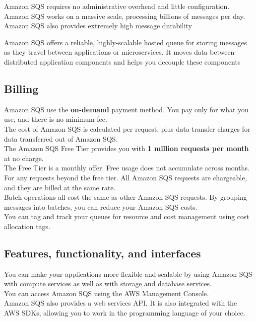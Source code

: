 \documentclass[12pt, letterpaper, twoside]{article}
\begin{document}
Amazon SQS requires no administrative overhead and little configuration. Amazon SQS works on a massive scale, processing 
billions of messages per day.\\
Amazon SQS also provides extremely high message durability

Amazon SQS offers a reliable, highly-scalable hosted queue for storing messages as they travel between applications or 
microservices. It moves data between distributed application components and helps you decouple these components

\subsection{Billing}
Amazon SQS use the \textbf{on-demand} payment method. You pay only for what you use, and there is no minimum fee.\\
The cost of Amazon SQS is calculated per request, plus data transfer charges for data transferred out of Amazon SQS.\\

The Amazon SQS Free Tier provides you with \textbf{1 million requests per month} at no charge.\\
The Free Tier is a monthly offer. Free usage does not accumulate across months.\\
For any requests beyond the free tier. All Amazon SQS requests are chargeable, and they are billed at 
the same rate.\\
Batch operations all cost the same as other Amazon SQS requests. By grouping messages into batches, you can reduce 
your Amazon SQS costs.\\

You can tag and track your queues for resource and cost management using cost allocation tags.\\

\subsection{Features, functionality, and interfaces}
You can make your applications more flexible and scalable by using Amazon SQS with compute services
as well as with storage and database services.\\

You can access Amazon SQS using the AWS Management Console.\\
Amazon SQS also provides a web services API. It is also integrated with the AWS SDKs, allowing you to 
work in the programming language of your choice.\\
\end{document}

